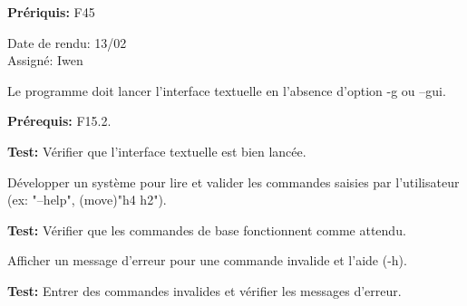 \documentclass{article}
\begin{document}
\begin{needbox}

    \textbf{Prériquis:} F45
    \begin{duedatebox}
        Date de rendu: 13/02\\
        Assigné: Iwen
    \end{duedatebox}
    \begin{subneedbox}
        Le programme doit lancer l'interface textuelle en l'absence d'option -g ou --gui.

        \textbf{Prérequis:} F15.2.

        \textbf{Test:} Vérifier que l'interface textuelle est bien lancée.
    \end{subneedbox}
    
    \begin{subneedbox}
        Développer un système pour lire et valider les commandes saisies par l'utilisateur (ex: "--help", (move)"h4 h2").

        \textbf{Test:} Vérifier que les commandes de base fonctionnent comme attendu.
    \end{subneedbox}
    
    \begin{subneedbox}
        Afficher un message d'erreur pour une commande invalide et l’aide (-h).

        \textbf{Test:} Entrer des commandes invalides et vérifier les messages d'erreur.
    \end{subneedbox}
\end{needbox}
\end{document}
